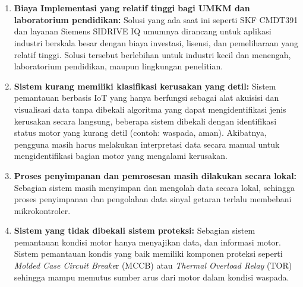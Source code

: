 \documentclass{elsinta}
\begin{document}
\section{\GapAnalysisTitle}

\subsection{\LimitationsTitle}
\begin{enumerate}
    \item \textbf{Biaya Implementasi yang relatif tinggi bagi UMKM dan laboratorium pendidikan:} Solusi yang ada saat ini seperti SKF CMDT391\cite{2.1.1} dan layanan Siemens SIDRIVE IQ\cite{2.1.2} umumnya dirancang untuk aplikasi industri berskala besar dengan biaya investasi, lisensi, dan pemeliharaan yang relatif tinggi. Solusi tersebut berlebihan untuk industri kecil dan menengah, laboratorium pendidikan, maupun lingkungan penelitian.
    \item \textbf{Sistem kurang memiliki klasifikasi kerusakan yang detil:} Sistem pemantauan berbasis IoT yang hanya berfungsi sebagai alat akuisisi dan visualisasi data tanpa dibekali algoritma yang dapat mengidentifikasi jenis kerusakan secara langsung\cite{1.1.17}, beberapa sistem dibekali dengan identifikasi status motor yang kurang detil (contoh: waspada, aman)\cite{2.1.8, 2.1.9}. Akibatnya, pengguna masih harus melakukan interpretasi data secara manual untuk mengidentifikasi bagian motor yang mengalami kerusakan. 
    \item \textbf{Proses penyimpanan dan pemrosesan masih dilakukan secara lokal:} Sebagian sistem masih menyimpan dan mengolah data secara lokal\cite{2.1.9, 1.1.17, 2.1.8}, sehingga proses penyimpanan dan pengolahan data sinyal getaran terlalu membebani mikrokontroler.
    \item \textbf{Sistem yang tidak dibekali sistem proteksi:} Sebagian sistem pemantauan kondisi motor hanya menyajikan data, dan informasi motor\cite{1.1.17, 2.1.9, 2.1.8}. Sistem pemantauan kondis yang baik memiliki komponen proteksi seperti \textit{Molded Case Circuit Breake}r (MCCB) atau \textit{Thermal Overload Relay} (TOR) sehingga mampu memutus sumber arus dari motor dalam kondisi waspada.
\end{enumerate}
\end{document}
